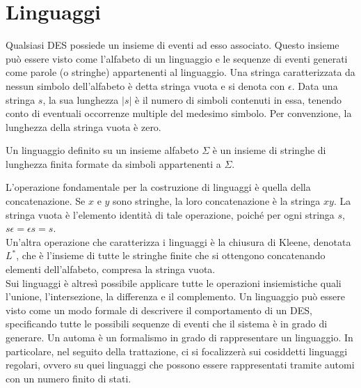 \newpage
\section{Linguaggi}
Qualsiasi DES possiede un insieme di eventi ad esso associato. Questo insieme può essere visto come l'alfabeto di un linguaggio e le sequenze di eventi generati come parole (o stringhe) appartenenti al linguaggio. Una stringa caratterizzata da nessun simbolo dell'alfabeto è detta stringa vuota e si denota con $\epsilon$.
Data una stringa $s$, la sua lunghezza $|s|$ è il numero di simboli contenuti in essa, tenendo conto di eventuali occorrenze multiple del medesimo simbolo. Per convenzione, la lunghezza della stringa vuota è zero.
\begin{defn}
Un linguaggio definito su un insieme alfabeto $\Sigma$ è un insieme di stringhe di lunghezza finita formate da simboli appartenenti a $\Sigma$.
\end{defn}
L'operazione fondamentale per la costruzione di linguaggi è quella della concatenazione. Se $x$ e $y$ sono stringhe, la loro concatenazione è la stringa $xy$. La stringa vuota è l'elemento identità di tale operazione, poiché per ogni stringa $s$, $s\epsilon = \epsilon s = s$.\\
Un'altra operazione che caratterizza i linguaggi è la chiusura di Kleene, denotata $L^*$, che è l'insieme di tutte le stringhe finite che si ottengono concatenando elementi dell'alfabeto, compresa la stringa vuota.\\
Sui linguaggi è altresì possibile applicare tutte le operazioni insiemistiche quali l'unione, l'intersezione, la differenza e il complemento.
Un linguaggio può essere visto come un modo formale di descrivere il comportamento di un DES, specificando tutte le possibili sequenze di eventi che il sistema è in grado di generare. 
Un automa è un formalismo in grado di rappresentare un linguaggio.
In particolare, nel seguito della trattazione, ci si focalizzerà sui cosiddetti linguaggi regolari, ovvero su quei linguaggi che possono essere rappresentati tramite automi con un numero finito di stati.

\newpage
